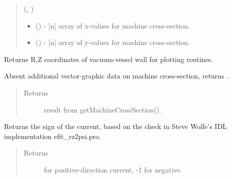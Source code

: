 \documentclass[letterpaper,10pt,english]{sphinxmanual}
\begin{document}
\begin{fulllineitems}
\begin{fulllineitems}
\begin{quote}
\begin{description}
(, )
\begin{itemize}
\item {} 
 () - {[}n{]} array of x-values for machine cross-section.

\item {} 
 () - {[}n{]} array of y-values for machine cross-section.

\end{itemize}


\end{description}\end{quote}

\end{fulllineitems}


\begin{fulllineitems}
\label{\detokenize{eqtools:eqtools.EFIT.EFITTree.getMachineCrossSectionFull}}
Returns R,Z coordinates of vacuum-vessel wall for plotting routines.

Absent additional vector-graphic data on machine cross-section, returns
{\hyperref[\detokenize{eqtools:eqtools.EFIT.EFITTree.getMachineCrossSection}]{}}.
\begin{quote}\begin{description}
\item[{Returns}] \leavevmode
result from getMachineCrossSection().

\end{description}\end{quote}

\end{fulllineitems}


\begin{fulllineitems}
\label{\detokenize{eqtools:eqtools.EFIT.EFITTree.getCurrentSign}}
Returns the sign of the current, based on the check in Steve Wolfe’s
IDL implementation efit\_rz2psi.pro.
\begin{quote}\begin{description}
\item[{Returns}]  for positive-direction current, -1 for negative.


\end{description}
\end{quote}
\end{fulllineitems}
\end{fulllineitems}
\end{document}
